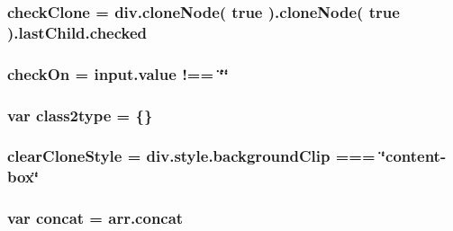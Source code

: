 \subsubsection[{\texorpdfstring{check\+Clone}{checkClone}}]{ check\+Clone = {\bf div.\+clone\+Node}( true ).{\bf clone\+Node}( true ).last\+Child.\+checked}\hypertarget{jquery-3_82_81_8js_aa8a4f169b5bc9da55242455f9feb6bb0}{}\label{jquery-3_82_81_8js_aa8a4f169b5bc9da55242455f9feb6bb0}
\subsubsection[{\texorpdfstring{check\+On}{checkOn}}]{ check\+On = {\bf input.\+value} !== \char`\"{}\char`\"{}}\hypertarget{jquery-3_82_81_8js_a3539969d0c80a3213f333f64ae391f3d}{}\label{jquery-3_82_81_8js_a3539969d0c80a3213f333f64ae391f3d}
\subsubsection[{\texorpdfstring{class2type}{class2type}}]{\setlength{\rightskip}{0pt plus 5cm}var class2type = \{\}}\hypertarget{jquery-3_82_81_8js_adef4ad1257810e1309dcf8489dcb4cc5}{}\label{jquery-3_82_81_8js_adef4ad1257810e1309dcf8489dcb4cc5}
\subsubsection[{\texorpdfstring{clear\+Clone\+Style}{clearCloneStyle}}]{ clear\+Clone\+Style = {\bf div.\+style.\+background\+Clip} === \char`\"{}content-\/box\char`\"{}}\hypertarget{jquery-3_82_81_8js_a84a1e96cbde9b0fb098c4b12b0b559d6}{}\label{jquery-3_82_81_8js_a84a1e96cbde9b0fb098c4b12b0b559d6}
\subsubsection[{\texorpdfstring{concat}{concat}}]{\setlength{\rightskip}{0pt plus 5cm}var concat = arr.\+concat}\hypertarget{jquery-3_82_81_8js_a15269536d89ee10703f1699529a34bdc}{}\label{jquery-3_82_81_8js_a15269536d89ee10703f1699529a34bdc}
